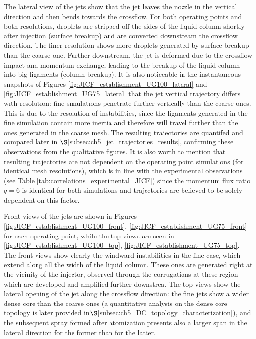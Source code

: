 The lateral view of the jets show that the jet leaves the nozzle in the vertical direction and then bends towards the crossflow. For both operating points and both resolutions, droplets are stripped off the sides of the liquid column shortly after injection (surface breakup) and are convected downstream the crossflow direction. The finer resolution shows more droplets generated by surface breakup than the coarse one. Further downstream, the jet is deformed due to the crossflow impact and momentum exchange, leading to the breakup of the liquid column into big ligaments (column breakup). It is also noticeable in the instantaneous snapshots of Figures \ref{fig:JICF_establishment_UG100_lateral} and \ref{fig:JICF_establishment_UG75_lateral} that the jet vertical trajectory differs with resolution: fine simulations penetrate further vertically than the coarse ones. This is due to the resolution of instabilities, since the ligaments generated in the fine simulation contain more inertia and therefore will travel further than the ones generated in the coarse mesh. The resulting trajectories are quantifed and compared later in $\S$\ref{subsec:ch5_jet_trajectories_results}, confirming these observations from the qualitative figures. It is also worth to mention that resulting trajectories are not dependent on the operating point simulations (for identical mesh resolutions), which is in line with the experimental observations (see Table \ref{tab:correlations_experimental_JICF}) since the momentum flux ratio $q = 6$ is identical for both simulations and trajectories are believed to be solely dependent on this factor.

Front views of the jets are shown in Figures \ref{fig:JICF_establishment_UG100_front}, \ref{fig:JICF_establishment_UG75_front} for each operating point, while the top views are seen in \ref{fig:JICF_establishment_UG100_top}, \ref{fig:JICF_establishment_UG75_top}. The front views show clearly the windward instabilities in the fine case, which extend along all the width of the liquid column. These ones are generated right at the vicinity of the injector, observed through the corrugations at these region which are developed and amplified further downstrea. The top views show the lateral opening of the jet along the crossflow direction: the fine jets show a wider dense core than the coarse ones (a quantitative analysis on the dense core topology is later provided in$\S$\ref{subsec:ch5_DC_topology_characterization}), and the subsequent spray formed after atomization presents also a larger span in the lateral direction for the former than for the latter.


